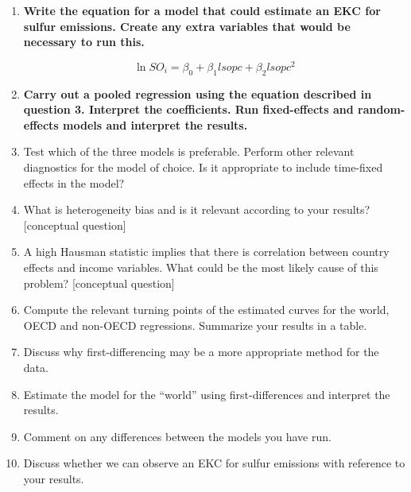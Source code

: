 \documentclass{scrartcl}
\begin{document}
\begin{enumerate}
	\item \textbf{Write the equation for a model that could estimate an EKC for sulfur emissions. Create any extra variables that would be necessary to run this.}
	
	\[ \ln{SO_i} = \beta_0 + \beta_1 lsopc + \beta_2 lsopc^2\]
	
	
	\item \textbf{Carry out a pooled regression using the equation described in question 3. Interpret the coefficients. Run fixed-effects and random-effects models and interpret the results.}
	
		
	
	\item Test which of the three models is preferable. Perform other relevant diagnostics for the model of choice. Is it appropriate to include time-fixed effects in the model?
	
	\item What is heterogeneity bias and is it relevant according to your results? [conceptual question]
	
	\item A high Hausman statistic implies that there is correlation between country effects and income variables. What could be the most likely cause of this problem? [conceptual question]
		
	\item Compute the relevant turning points of the estimated curves for the world, OECD and non-OECD regressions. Summarize your results in a table.
		
	\item Discuss why first-differencing may be a more appropriate method for the data.
	
	\item Estimate the model for the ``world'' using first-differences and interpret the results.
	
	\item Comment on any differences between the models you have run.
	
	\item Discuss whether we can observe an EKC for sulfur emissions with reference to your results.
	
	\end{enumerate}
	


	
\end{document}
